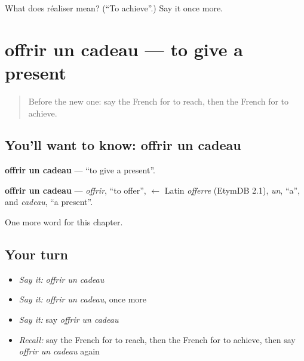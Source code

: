 \begin{tcolorbox}[breakable,colback=teal!4,colframe=teal!35!black,title={Before you move on}]
What does réaliser mean? (\textquotedblleft{}To achieve\textquotedblright{}.) Say it once more.
\end{tcolorbox}
\section[offrir un cadeau]{offrir un cadeau — to give a present}

\label{lesson:FR-C210-offrir-un-cadeau}



\begin{quote}
Before the new one: say the French for to reach, then the French for to achieve.
\end{quote}

\subsection*{You'll want to know: offrir un cadeau}
\textbf{offrir un cadeau} — \textquotedblleft{}to give a present\textquotedblright{}.

\begin{cousinweb}
\textbf{offrir un cadeau} — \emph{offrir}, \textquotedblleft{}to offer\textquotedblright{}, $\leftarrow$ Latin \emph{offerre} (EtymDB 2.1), \emph{un}, \textquotedblleft{}a\textquotedblright{}, and \emph{cadeau}, \textquotedblleft{}a present\textquotedblright{}.
\end{cousinweb}

\begin{grammarlens}[title={What you've built}]
One more word for this chapter.
\end{grammarlens}

\subsection*{Your turn}
\begin{itemize}
\raggedright
  \item \emph{Say it:} \emph{offrir un cadeau}
  \item \emph{Say it:} \emph{offrir un cadeau}, once more
  \item \emph{Say it:} say \emph{offrir un cadeau}
  \item \emph{Recall:} say the French for to reach, then the French for to achieve, then say \emph{offrir un cadeau} again
\end{itemize}

